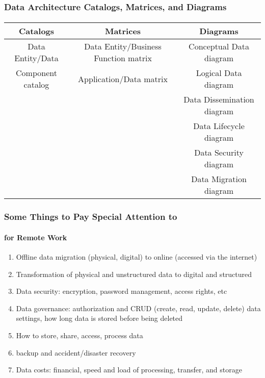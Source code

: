 \documentclass[aspectratio=169, table]{beamer}
\begin{document}
    \begin{frame}
        \frametitle{ Data Architecture Catalogs, Matrices, and Diagrams}
        \framesubtitle{\hspace{1cm}}
        \begin{small}
            \begin{table}[]
                \begin{tabular}{|c|c|c|}
                    \hline
                    \textbf{Catalogs} & \textbf{Matrices} & \textbf{Diagrams} \\ \hline
                    Data Entity/Data & Data Entity/Business Function matrix & Conceptual Data diagram \\
                    Component catalog & Application/Data matrix & Logical Data diagram \\
                    & & Data Dissemination diagram \\
                    & & Data Lifecycle diagram \\
                    & & Data Security diagram \\
                    & & Data Migration diagram \\ \hline
                \end{tabular}
            \end{table}
        \end{small}
    \end{frame}


    \begin{frame}
        \frametitle{Some Things to Pay Special Attention to }
        \framesubtitle{for Remote Work}
        \begin{enumerate}
            \item Offline data migration (physical, digital) to online (accessed via the internet)
            \item Transformation of physical and unstructured data to digital and structured
            \item Data security: encryption, password management, access rights, etc
            \item Data governance: authorization and CRUD (create, read, update, delete) data settings, how long data is stored before being deleted
            \item How to store, share, access, process data
            \item backup and accident/disaster recovery
            \item Data costs: financial, speed and load of processing, transfer, and storage
        \end{enumerate}
    \end{frame}
\end{document}
